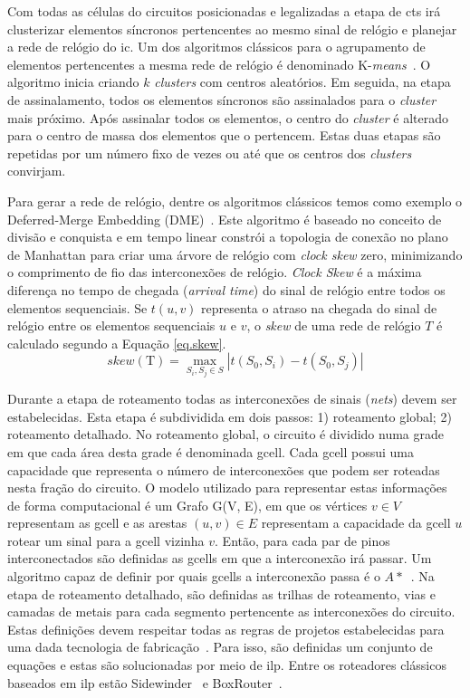 Com todas as células do circuitos posicionadas e legalizadas a etapa de \ac{cts} irá clusterizar elementos síncronos pertencentes ao mesmo sinal de relógio e planejar a rede de relógio do \ac{ic}.
Um dos algoritmos clássicos para o agrupamento de elementos pertencentes a mesma rede de relógio é denominado K-\textit{means}~\cite{selim1984k}.
O algoritmo inicia criando $k$ \textit{clusters} com centros aleatórios. Em seguida, na etapa de assinalamento, todos os elementos síncronos são assinalados para o \textit{cluster} mais próximo.
Após assinalar todos os elementos, o centro do \textit{cluster} é alterado para o centro de massa dos elementos que o pertencem. Estas duas etapas são repetidas por um número fixo de vezes ou até que os centros dos \textit{clusters} convirjam.

Para gerar a rede de relógio, dentre os algoritmos clássicos temos como exemplo o Deferred-Merge Embedding (DME)~\cite{boese1992zero}.
Este algoritmo é baseado no conceito de divisão e conquista e em tempo linear constrói a topologia de conexão no plano de Manhattan para criar uma árvore de relógio com \textit{clock skew} zero, minimizando o comprimento de fio das interconexões de relógio.
\textit{Clock Skew} é a máxima diferença no tempo de chegada (\textit{arrival time}) do sinal de relógio entre todos os elementos sequenciais. Se $t(u,v)$ representa o atraso na chegada do sinal de relógio entre os elementos sequenciais $u$ e $v$, o \textit{skew} de uma rede de relógio $T$ é calculado segundo a Equação \ref{eq.skew}.
\begin{equation} \label{eq.skew}
	 \displaystyle \operatorname{\textit{skew}(T)} = \max_{S_{i}, S_{j} \in S} | t(S_{0},S_{i})-t(S_{0},S_{j})|
\end{equation} 


Durante a etapa de roteamento todas as interconexões de sinais (\textit{nets}) devem ser estabelecidas. 
Esta etapa é subdividida em dois passos: 1) roteamento global; 2) roteamento detalhado.
No roteamento global, o circuito é dividido numa grade em que cada área desta grade é denominada gcell.
Cada gcell possui uma capacidade que representa o número de interconexões que podem ser roteadas nesta fração do circuito.
O modelo utilizado para representar estas informações de forma computacional é um Grafo G(V, E), em que os vértices $v \in V$ representam as gcell e as arestas $(u, v) \in E$ representam a capacidade da gcell $u$ rotear um sinal para a gcell vizinha $v$.
Então, para cada par de pinos interconectados são definidas as gcells em que a interconexão irá passar.
Um algoritmo capaz de definir por quais gcells a interconexão passa é o $A*$~\cite{russell2009artificial}.
Na etapa de roteamento detalhado, são definidas as trilhas de roteamento, vias e camadas de metais para cada segmento pertencente as interconexões do circuito.
Estas definições devem respeitar todas as regras de projetos estabelecidas para uma dada tecnologia de fabricação~\cite{kahng2011vlsi}.
Para isso, são definidas um conjunto de equações e estas são solucionadas por meio de \ac{ilp}.
Entre os roteadores clássicos baseados em \ac{ilp} estão Sidewinder~\cite{hu2008sidewinder} e BoxRouter~\cite{cho2007boxrouter}.


